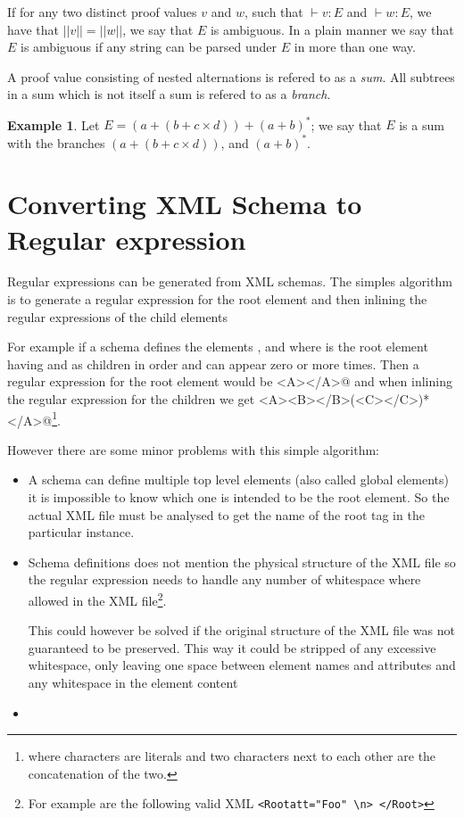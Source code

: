 \documentclass[a4paper, oneside]{memoir}
\theoremstyle{definition}
\newtheorem{example}{Example}
\begin{document}
If for any two distinct proof values $v$ and $w$, such that $\vdash v : E$ and $\vdash w : E$, we have that $||v|| = ||w||$, we say that $E$ is ambiguous. In a plain manner we say that $E$ is ambiguous if any string can be parsed under $E$ in more than one way.

A proof value consisting of nested alternations is refered to as a \emph{sum}. All subtrees in a sum which is not itself a sum is refered to as a \emph{branch}.

\begin{example}
Let $E = (a + (b + c \times d)) + (a + b)^{*}$; we say that $E$ is a sum with
the branches $(a + (b + c \times d))$, and $(a + b)^{\ast}$.
\end{example}

\section{Converting XML Schema to Regular expression}
\label{sec:convert}

Regular expressions can be generated from XML schemas. The simples algorithm is
to generate a regular expression for the root element and then inlining the
regular expressions of the child elements

For example if a schema defines the elements \verb@A@, \verb@B@ and \verb@C@
where \verb@A@ is the root element having \verb@B@ and \verb@C@ as children in
order and \verb@C@ can appear zero or more times. Then a regular expression for
the root element would be \verb@<A></A>@ and when inlining the regular
expression for the children we get
\verb@<A><B></B>(<C></C>)*</A>@\footnote{where characters are literals and two
  characters next to each other are the concatenation of the two.}.
  
  However there are some minor problems with this simple algorithm:

  \begin{itemize}
  \item A schema can define multiple top level elements (also called global
    elements) it is impossible to know which one is intended to be the root
    element. So the actual XML file must be analysed to get the name of the root
    tag in the particular instance.

  \item Schema definitions does not mention the physical structure of the XML
    file so the regular expression needs to handle any number of whitespace
    where allowed in the XML file\footnote{For example are the following valid
      XML \texttt{<Root{\textvisiblespace}att="Foo"\textvisiblespace%
        \textvisiblespace\textbackslash{n}\textvisiblespace>\textvisiblespace%
        </Root\textvisiblespace\textvisiblespace>}}.

    This could however be solved if the original structure of the XML file was
    not guaranteed to be preserved. This way it could be stripped of any
    excessive whitespace, only leaving one space between element names and
    attributes and any whitespace in the element content

  \item 

  \end{itemize}
\end{document}
